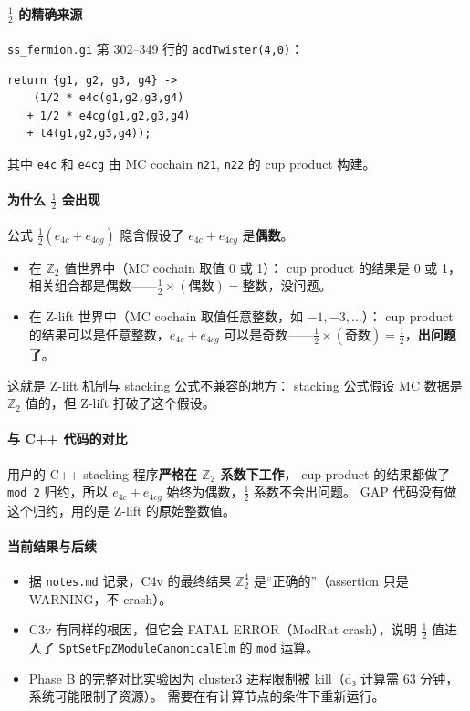 \documentclass[a4paper,fontset=ubuntu,12pt]{ctexart}
\begin{document}
\paragraph{$\frac{1}{2}$ 的精确来源}
\texttt{ss\_fermion.gi} 第 302--349 行的 \texttt{addTwister(4,0)}：
\begin{lstlisting}[basicstyle=\ttfamily\small]
return {g1, g2, g3, g4} ->
    (1/2 * e4c(g1,g2,g3,g4)
   + 1/2 * e4cg(g1,g2,g3,g4)
   + t4(g1,g2,g3,g4));
\end{lstlisting}
其中 \texttt{e4c} 和 \texttt{e4cg} 由 MC cochain \texttt{n21}, \texttt{n22} 的 cup product 构建。

\paragraph{为什么 $\frac{1}{2}$ 会出现}
公式 $\frac{1}{2}(e_{4c} + e_{4cg})$ 隐含假设了 $e_{4c} + e_{4cg}$ 是\textbf{偶数}。
\begin{itemize}
\item 在 $\mathbb{Z}_2$ 值世界中（MC cochain 取值 0 或 1）：
      cup product 的结果是 0 或 1，相关组合都是偶数——$\frac{1}{2} \times (\text{偶数}) = \text{整数}$，没问题。
\item 在 Z-lift 世界中（MC cochain 取值任意整数，如 $-1, -3, \ldots$）：
      cup product 的结果可以是任意整数，$e_{4c} + e_{4cg}$ 可以是奇数——$\frac{1}{2} \times (\text{奇数}) = \frac{1}{2}$，\textbf{出问题了}。
\end{itemize}
这就是 Z-lift 机制与 stacking 公式不兼容的地方：
stacking 公式假设 MC 数据是 $\mathbb{Z}_2$ 值的，但 Z-lift 打破了这个假设。

\paragraph{与 C++ 代码的对比}
用户的 C++ stacking 程序\textbf{严格在 $\mathbb{Z}_2$ 系数下工作}，
cup product 的结果都做了 \texttt{mod 2} 归约，所以 $e_{4c} + e_{4cg}$ 始终为偶数，$\frac{1}{2}$ 系数不会出问题。
GAP 代码没有做这个归约，用的是 Z-lift 的原始整数值。

\paragraph{当前结果与后续}
\begin{itemize}
\item 据 \texttt{notes.md} 记录，C4v 的最终结果 $\mathbb{Z}_2^4$ 是``正确的''（assertion 只是 WARNING，不 crash）。
\item C3v 有同样的根因，但它会 FATAL ERROR（ModRat crash），说明 $\frac{1}{2}$ 值进入了 \texttt{SptSetFpZModuleCanonicalElm} 的 \texttt{mod} 运算。
\item Phase B 的完整对比实验因为 cluster3 进程限制被 kill（d₃ 计算需 63 分钟，系统可能限制了资源）。
      需要在有计算节点的条件下重新运行。
\end{itemize}
\end{document}
